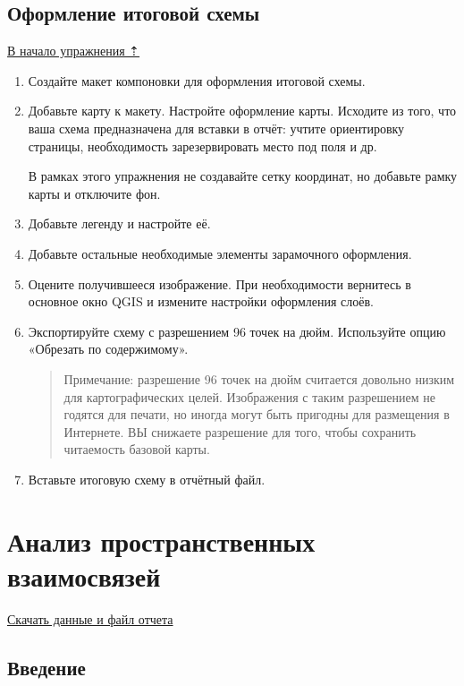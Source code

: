 \documentclass[
  12pt,
]{book}
\begin{document}
\hypertarget{map-ref-districts-result}{%
\section{Оформление итоговой схемы}\label{map-ref-districts-result}}

\protect\hyperlink{map-ref-districts}{В начало упражнения ⇡}

\begin{enumerate}
\def\labelenumi{\arabic{enumi}.}
\item
  Создайте макет компоновки для оформления итоговой схемы.
\item
  Добавьте карту к макету. Настройте оформление карты. Исходите из того, что ваша схема предназначена для вставки в отчёт: учтите ориентировку страницы, необходимость зарезервировать место под поля и др.

  В рамках этого упражнения не создавайте сетку координат, но добавьте рамку карты и отключите фон.
\item
  Добавьте легенду и настройте её.
\item
  Добавьте остальные необходимые элементы зарамочного оформления.
\item
  Оцените получившееся изображение. При необходимости вернитесь в основное окно QGIS и измените настройки оформления слоёв.
\item
  Экспортируйте схему с разрешением 96 точек на дюйм. Используйте опцию «Обрезать по содержимому».

  \begin{quote}
  Примечание: разрешение 96 точек на дюйм считается довольно низким для картографических целей. Изображения с таким разрешением не годятся для печати, но иногда могут быть пригодны для размещения в Интернете. ВЫ снижаете разрешение для того, чтобы сохранить читаемость базовой карты.
  \end{quote}
\item
  Вставьте итоговую схему в отчётный файл.
\end{enumerate}

\hypertarget{overlay}{%
\chapter{Анализ пространственных взаимосвязей}\label{overlay}}

\href{http://autolab.geogr.msu.ru/gis/data/Ex10.zip}{Скачать данные и файл отчета}

\hypertarget{overlay-intro}{%
\section{Введение}\label{overlay-intro}}
\end{document}
